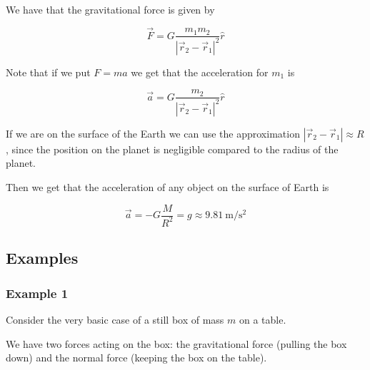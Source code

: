 \documentclass[10pt]{extarticle}
\begin{document}
\begin{center}

  \label{fig:gravforce_masses}
\end{center}

We have that the gravitational force is given by

$$
  \vec F = G \frac{ m_1 m_2}{|\vec r_2 - \vec r_1|^2} \hat r
$$

Note that if we put $F = ma$ we get that the acceleration for $m_1$ is

$$
  \vec a = G \frac{m_2}{|\vec r_2 - \vec r_1|^2} \hat r
$$

If we are on the surface of the Earth we can use the approximation $|\vec r_2 - \vec r_1| \approx R$, since the position on the planet is negligible compared to the radius of the planet.

Then we get that the acceleration of any object on the surface of Earth is

$$
  \vec a = - G \frac{M}{R^2} = g \approx \SI{9.81}{\meter \per \second \squared}
$$

\subsection{Examples}

\subsubsection{Example 1}

Consider the very basic case of a still box of mass $m$ on a table.

We have two forces acting on the box: the gravitational force (pulling the box down) and the normal force (keeping the box on the table).
\end{document}
